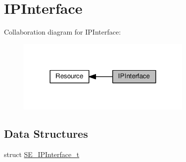 \hypertarget{group__IPInterface}{}\section{I\+P\+Interface}
\label{group__IPInterface}
Collaboration diagram for I\+P\+Interface\+:\nopagebreak
\begin{figure}[H]
\begin{center}
\leavevmode
\includegraphics[width=240pt]{group__IPInterface}
\end{center}
\end{figure}
\subsection*{Data Structures}
\begin{DoxyCompactItemize}
\item 
struct \hyperlink{structSE__IPInterface__t}{S\+E\+\_\+\+I\+P\+Interface\+\_\+t}
\end{DoxyCompactItemize}
